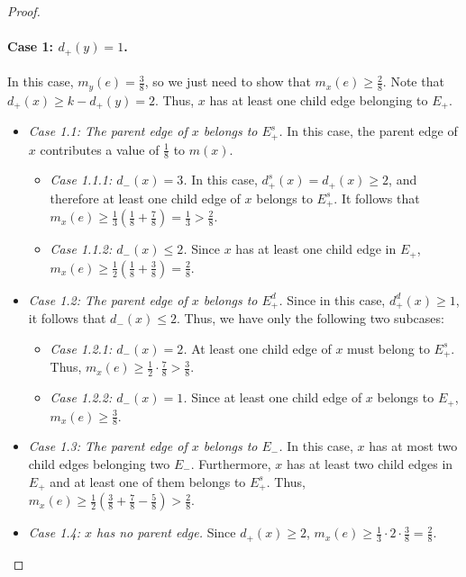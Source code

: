 \documentclass[smallextended]{svjour3}
\begin{document}
\begin{proof}
\paragraph{Case 1: $d_+(y)=1$.} In this case, $m_y(e)=\frac{3}{8}$, so we just need to show that $m_x(e)\geq \frac{2}{8}$.
Note that $d_+(x) \geq k - d_+(y) = 2$. Thus, $x$ has at least one child edge belonging to $E_+$.
\begin{itemize} \item {\em Case 1.1: The parent edge of $x$ belongs to $E_+^s$.}
  In this case, the parent edge of $x$ contributes a value of $\frac18$ to $m(x)$. 
\begin{itemize}\item {\em Case 1.1.1: $d_{-}(x)=3$.} In this case, $d^s_{+}(x)=d_{+}(x)\geq 2$, and therefore at least one child edge of $x$ belongs to $E_+^s$. It follows that $m_x(e)\geq \frac{1}{3} (\frac{1}{8}+\frac{7}{8})=\frac{1}{3} > \frac{2}{8}$.
\item {\em Case 1.1.2: $d_{-}(x)\leq 2$.} Since $x$ has at least one child edge in $E_+$, $m_x(e)\geq\frac{1}{2}(\frac{1}{8}+\frac{3}{8})=\frac{2}{8}$.
\end{itemize}
\item {\em Case 1.2: The parent edge of $x$ belongs to $E_+^d$.}
  Since in this case, $d_+^d(x) \geq 1$, it follows that $d_-(x) \leq 2$.
  Thus, we have only the following two subcases:
\begin{itemize}\item {\em Case 1.2.1: $d_{-}(x)=2$.} At least one child edge of $x$ must belong to $E_+^s$. Thus, $m_x(e)\geq \frac{1}{2}\cdot\frac{7}{8}>\frac{3}{8}$.
\item {\em Case 1.2.2: $d_{-}(x)=1$.} Since at least one child edge of $x$ belongs to $E_+$, $m_x(e)\geq \frac{3}{8}$.
\end{itemize}
\item {\em Case 1.3: The parent edge of $x$ belongs to $E_-$.}
  In this case, $x$ has at most two child edges belonging two $E_-$.
  Furthermore, $x$ has at least two child edges in $E_+$ and at least one of them belongs to $E_+^s$.
  Thus, $m_x(e) \geq \frac12 (\frac38 + \frac78 - \frac58) > \frac28$.

\item {\em Case 1.4: $x$ has no parent edge.} Since $d_{+}(x)\geq 2$, $m_x(e)\geq \frac13 \cdot 2\cdot \frac{3}{8} = \frac28$.
\end{itemize}

\end{proof}
\end{document}
